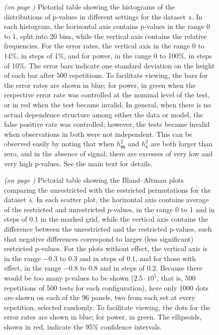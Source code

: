 \begin{figure}[!b]
\caption{\emph{(on page \pageref{fig:errorrates_noref})} Pictorial table showing the histograms of the distributions of p-values in different settings for the dataset \textsc{a}. In each histogram, the horizontal axis contains p-values in the range 0 to 1, split into 20 bins, while the vertical axis contains the relative frequencies. For the error rates, the vertical axis in the range 0 to 14\%, in steps of 1\%, and for power, in the range 0 to 100\%, in steps of 10\%. The error bars indicate one standard deviation on the height of each bar after 500 repetitions. To facilitate viewing, the bars for the error rates are shown in blue; for power, in green when the respective error rate was controlled at the nominal level of the test, or in red when the test became invalid. In general, when there is no actual dependence structure among either the data or model, the false positive rate was controlled; however, the tests became invalid when observations in both were not independent. This can be observed easily by noting that when $h^2_{\mathbf{m}}$ and $h^2_{\boldsymbol{\epsilon}}$ are both larger than zero, and in the absence of signal, there are excesses of very low and very high p-values. See the main text for details.}
\label{fig:errorrates}
\end{figure}

\begin{figure}[!b]
\caption{\emph{(on page \pageref{fig:bland_altman_noref})} Pictorial table showing the Bland--Altman plots comparing the unrestricted with the restricted permutations for the dataset \textsc{a}. In each scatter plot, the horizontal axis contains average of the restricted and unrestricted p-values, in the range 0 to 1 and in steps of 0.1 in the marked grid, while the vertical axis contains the difference between the unrestricted and the restricted p-values, such that negative differences correspond to larger (less significant) restricted p-values. For the plots without effect, the vertical axis is in the range $-0.3$ to $0.3$ and in steps of $0.1$, and for those with effect, in the range $-0.8$ to $0.8$ and in steps of $0.2$. Because there would be too many p-values to be shown ($2.5\cdot 10^{5}$, that is, 500 repetitions of 500 tests for each configuration), here only 1000 dots are shown on each of the 96 panels, two from each set at every repetition, selected randomly. To facilitate viewing, the dots for the error rates are shown in blue; for power, in green. The ellipsoids, shown in red, indicate the 95\% confidence intervals.}
\label{fig:bland_altman}
\end{figure}


